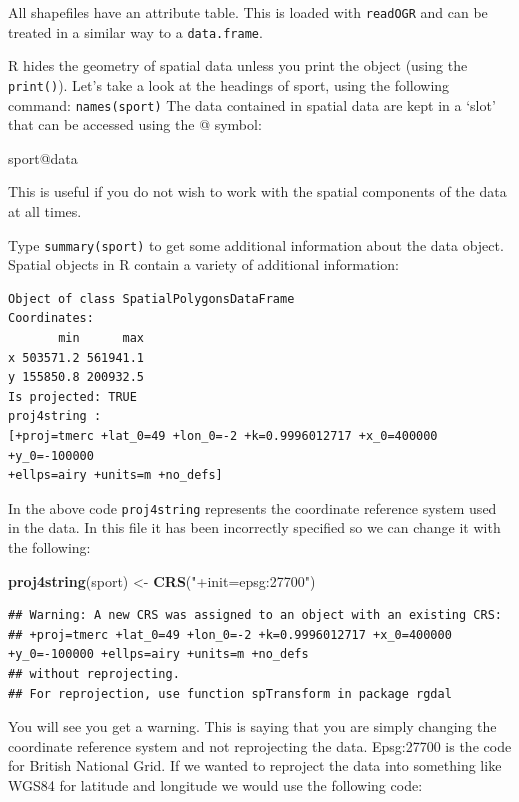 \documentclass[]{article}
\newenvironment{Shaded}{}{}
\newcommand{\KeywordTok}[1]{\textcolor[rgb]{0.00,0.44,0.13}{\textbf{{#1}}}}
\newcommand{\StringTok}[1]{\textcolor[rgb]{0.25,0.44,0.63}{{#1}}}
\newcommand{\NormalTok}[1]{{#1}}
\begin{document}
All shapefiles have an attribute table. This is loaded with
\texttt{readOGR} and can be treated in a similar way to a
\texttt{data.frame}.

R hides the geometry of spatial data unless you print the object (using
the \texttt{print()}). Let's take a look at the headings of sport, using
the following command: \texttt{names(sport)} The data contained in
spatial data are kept in a `slot' that can be accessed using the @
symbol:

\begin{Shaded}
\begin{Highlighting}[]
\NormalTok{sport@data}
\end{Highlighting}
\end{Shaded}
This is useful if you do not wish to work with the spatial components of
the data at all times.

Type \texttt{summary(sport)} to get some additional information about
the data object. Spatial objects in R contain a variety of additional
information:

\begin{verbatim}
Object of class SpatialPolygonsDataFrame
Coordinates:
       min      max
x 503571.2 561941.1
y 155850.8 200932.5
Is projected: TRUE 
proj4string :
[+proj=tmerc +lat_0=49 +lon_0=-2 +k=0.9996012717 +x_0=400000 +y_0=-100000
+ellps=airy +units=m +no_defs]
\end{verbatim}
In the above code \texttt{proj4string} represents the coordinate
reference system used in the data. In this file it has been incorrectly
specified so we can change it with the following:

\begin{Shaded}
\begin{Highlighting}[]
\KeywordTok{proj4string}\NormalTok{(sport) <- }\KeywordTok{CRS}\NormalTok{(}\StringTok{"+init=epsg:27700"}\NormalTok{)}
\end{Highlighting}
\end{Shaded}
\begin{verbatim}
## Warning: A new CRS was assigned to an object with an existing CRS:
## +proj=tmerc +lat_0=49 +lon_0=-2 +k=0.9996012717 +x_0=400000 +y_0=-100000 +ellps=airy +units=m +no_defs
## without reprojecting.
## For reprojection, use function spTransform in package rgdal
\end{verbatim}
You will see you get a warning. This is saying that you are simply
changing the coordinate reference system and not reprojecting the data.
Epsg:27700 is the code for British National Grid. If we wanted to
reproject the data into something like WGS84 for latitude and longitude
we would use the following code:
\end{document}
